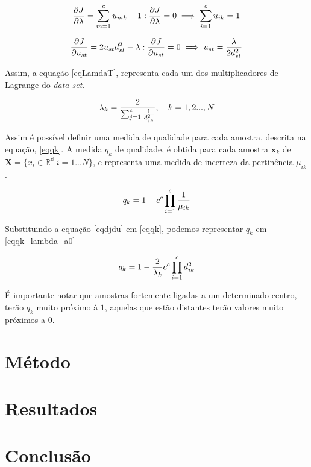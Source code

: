 \documentclass[]{article}
\begin{document}
\begin{equation}
\label{eqdjdl}
{{\partial J} \over {\partial \lambda}} = \sum_{m=1}^c u_{mk}-1 : {{\partial J} \over {\partial \lambda}} = 0 \implies \sum_{i=1}^c u_{ik}=1
\end{equation}

\begin{equation}
\label{eqdjdu}
{{\partial J} \over {\partial u_{st}}} = 2u_{st} d_{st}^2 - \lambda : {{\partial J} \over {\partial u_{st}}} = 0 \implies u_{st} = {\lambda \over {2d_{st}^2}}
\end{equation}

Assim, a equação \ref{eqLamdaT}, representa cada um dos multiplicadores de Lagrange do \textit{data set}.

\begin{equation}
\label{eqLamdaT}
\lambda_{k} = {2 \over {\sum_{j=1}^c {1 \over d_{jk}^2}}}, \quad k=1,2...,N
\end{equation}

Assim é possível definir uma medida de qualidade para cada amostra, descrita na equação, \ref{eqqk}. A medida $q_k$ de qualidade, é obtida para cada amostra $\mathbf{x}_k$ de $\mathbf{X}=\{x_i \in \mathbb{R^d} | i=1...N\}$, e representa uma medida de incerteza da pertinência $\mu_{ik}$.

\begin{equation}
\label{eqqk}
q_k = 1 - c^c \prod_{i=1}^c {1 \over \mu_{ik}}
\end{equation}

Substituindo a equação \ref{eqdjdu} em \ref{eqqk}, podemos representar $q_k$ em \ref{eqqk_lambda_a0}

\begin{equation}
\label{eqqk_lambda_a0}
q_k = 1 - {2 \over {\lambda_k}} c^c \prod_{i=1}^c d_{ik}^2
\end{equation}

É importante notar que amostras fortemente ligadas a um determinado centro, terão $q_k$ muito próximo à $1$, aquelas que estão distantes terão valores muito próximos a 0.


\section{Método}

\section{Resultados}

\section{Conclusão}
\end{document}
